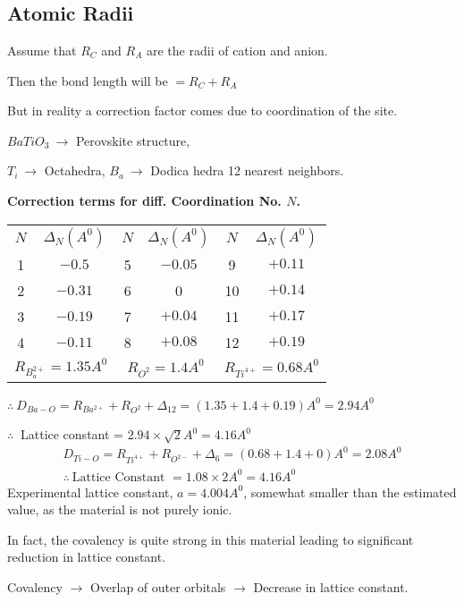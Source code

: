 \chapter[Lecture 16]{}\label{lec16}

\section*{Atomic Radii}

Assume that $R_{C}$ and $R_{A}$ are the radii of cation and anion.

Then the bond length will be $=R_{C}+R_{A}$

But in reality a correction factor comes due to coordination of the site.

\begin{example*}
$BaTiO_{3} \ \to$ Perovskite structure,

$T_{i} \ \to$ Octahedra, $B_{a} \ \to$ Dodica hedra 12 nearest neighbors.
\begin{center}
{\bf Correction terms for diff. Coordination No. \boldmath$N$.}
\medskip

\renewcommand{\arraystretch}{1.2}
\begin{tabular}{cc|cc|cc}
\hline
$N$ & $\Delta_{N}(A^{0})$ & $N$ & $\Delta_{N}(A^{0})$ & $N$ & $\Delta_{N}(A^{0})$\\
1 & $-0.5$ & 5 & $-0.05$ & 9 & $+0.11$\\
2 & $-0.31$ & 6 & 0 & 10 & $+0.14$\\
3 & $-0.19$ & 7 & $+0.04$ & 11 & $+0.17$\\
4 & $-0.11$ & 8 & $+0.08$ & 12 & $+0.19$\\
\hline
\multicolumn{2}{c}{$R_{B^{2+}_{a}}=1.35A^{0}$} & \multicolumn{2}{c}{$R_{O^{2}}=1.4A^{0}$} & \multicolumn{2}{c}{$R_{Ti^{4+}}=0.68A^{0}$}\\
\hline
\end{tabular}
\end{center}

$\therefore \ D_{Ba-O}=R_{Ba^{2+}}+R_{O^{2}}+\Delta_{12}=(1.35+1.4+0.19)A^{0}=2.94A^{0}$

$\therefore \ $ Lattice constant = $2.94\times \sqrt{2}A^{0}=4.16A^{0}$
\begin{gather*}
D_{Ti-O}=R_{Ti^{4+}}+R_{O^{2-}}+\Delta_{6}=(0.68+1.4+0)A^{0}=2.08A^{0}\\
\therefore \ \text{Lattice Constant } =1.08\times 2 A^{0}=4.16A^{0}
\end{gather*}
Experimental lattice constant, $a=4.004A^{0}$, somewhat smaller than the estimated value, as the material is not purely ionic.

In fact, the covalency is quite strong in this material leading to significant reduction in lattice constant.

Covalency $\to$ Overlap of outer orbitals $\to$ Decrease in lattice constant.
\end{example*}

